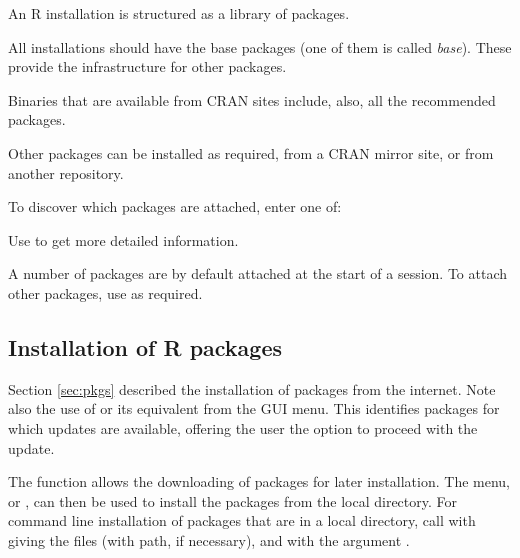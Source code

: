 \noindent
An R installation is structured as a library of packages.
\begin{itemizz}
\item All installations should have the base packages (one of them is
  called \textit{base}).  These provide the infrastructure for other
  packages.
\item Binaries that are available from CRAN sites include, also, all
the recommended packages.
\item Other packages can be installed as required, from a CRAN mirror
site, or from another repository.
\end{itemizz}

\begin{marginfigure}[12pt]
To discover which packages are attached, enter one of:
\begin{knitrout}
\color{fgcolor}\begin{kframe}
\begin{alltt}
\hlstd{()}
\hlstd{()}
\end{alltt}
\end{kframe}
\end{knitrout}
Use  to get more detailed information.
\end{marginfigure}
A number of packages are by default attached
at the start of a session.  To attach other packages, use
 as required.

\subsection{Installation of R packages}\label{ss:installpack}
Section \ref{sec:pkgs} described the installation of packages from the
internet. Note also the use of  or its
equivalent from the GUI menu.  This identifies packages for which
updates are available, offering the user the option to proceed with
the update.

The function  allows the downloading of
packages for later installation.  The menu, or
, can then be used to install the packages
from the local directory.  For command line installation of packages that
are in a local directory, call  with
 giving the files (with path, if necessary), and with the
argument .

